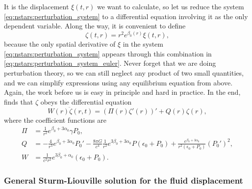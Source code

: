 It is the displacement $\xi(t,r)$ we want to calculate, so let us reduce the system \eqref{eq:nstars:perturbation_system} to a differential equation involving it as the only dependent variable.
Along the way, it is convenient to define
\begin{equation}
	\zeta(t,r) = r^2 e^{\beta_0(r)} \xi(t,r),
\label{eq:nstars:definition_zeta}
\end{equation}
because the only spatial derivative of $\xi$ in the system \eqref{eq:nstars:perturbation_system} appears through this combination in \cref{eq:nstars:perturbation_system_euler}.
Never forget that we are doing perturbation theory, so we can still neglect any product of two small quantities, and we can simplify expressions using any equilibrium equation from above.
Again, the work before us is easy in principle and hard in practice.
In the end, \cite[equation 26.19]{ref:mtw} finds that $\zeta$ obeys the differential equation
\begin{equation}
	W(r) \ddot{\zeta}(r,t) = (\Pi(r) \zeta'(r))' + Q(r) \zeta(r) ,
\label{eq:nstars:diffeq_zeta}
\end{equation}
where the coefficient functions are
\begin{subequations}
\begin{align}
	\Pi &= \frac{1}{r^2} e^{\beta_0 + 3 \alpha_0} \gamma P_0 , \label{eq:nstars:sturm_liouville_coefficients_Pi} \\
	Q   &= -\frac{4}{r^3} e^{\beta_0 + 3 \alpha_0} P_0' - \frac{8 \pi G}{c^4} \frac{1}{r^2} e^{3 \beta_0 + 3 \alpha_0} P (\epsilon_0 + P_0) + \frac{e^{\beta_0 + 3 \alpha_0}}{r^2(\epsilon_0 + P_0)} \left( P_0' \right)^2 , \label{eq:nstars:sturm_liouville_coefficients_Q} \\
	W   &= \frac{1}{c^2 r^2} e^{3 \beta_0 + \alpha_0} (\epsilon_0 + P_0) . \label{eq:nstars:sturm_liouville_coefficients_W}
\end{align}
\label{eq:nstars:sturm_liouville_coefficients}
\end{subequations}

\subsubsection{General Sturm-Liouville solution for the fluid displacement}

